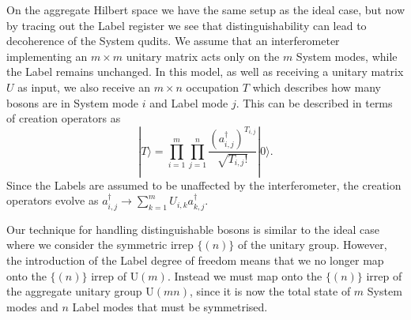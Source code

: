 On the aggregate Hilbert space we have the same setup as the ideal case, but now by tracing out the Label register we see that distinguishability can lead to decoherence of the System qudits.
We assume that an interferometer implementing an $m \times m$ unitary matrix acts only on the $m$ System modes, while the Label remains unchanged. 
In this model, as well as receiving a unitary matrix $U$ as input, we also receive an $m \times n$ occupation $T$ which describes how many bosons are in System mode $i$ and Label mode $j$. 
This can be described in terms of creation operators as
\begin{equation}
|T\rangle = \prod_{i=1}^m \prod_{j = 1}^n \frac{(a_{i,j}^\dagger)^{T_{i,j}}}{\sqrt{T_{i,j}!}}|0\rangle.
\end{equation}
Since the Labels are assumed to be unaffected by the interferometer, the creation operators evolve as $a_{i, j}^\dagger \rightarrow \sum_{k = 1}^m U_{i,k}a_{k, j}^\dagger$.

Our technique for handling distinguishable bosons is similar to the ideal case where we consider the symmetric irrep $\{(n)\}$ of the unitary group. 
However, the introduction of the Label degree of freedom means that we no longer map onto the $\{(n)\}$ irrep of $\mathrm{U}(m)$. 
Instead we must map onto the $\{(n)\}$ irrep of the aggregate unitary group $\mathrm{U}(mn)$, since it is now the total state of $m$ System modes and $n$ Label modes that must be symmetrised.

